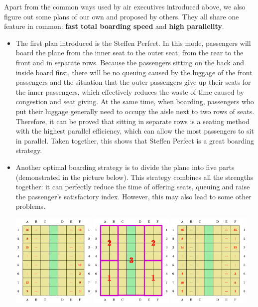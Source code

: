 \documentclass{article}
\theoremstyle{definition}
\theoremstyle{remark}
\numberwithin{equation}{section}
\begin{document}
	Apart from the common ways used by air executives introduced above, we also figure out some plans of our own and proposed by others. They all share one feature in common: \textbf{fast total boarding speed} and \textbf{high parallelity}.
	\begin{itemize}
		\item The first plan introduced is the Steffen Perfect\cite{steffen}. In this mode,  passengers will board the plane from the inner seat to the outer seat, from the rear to the front and in separate rows. Because the passengers sitting on the back and inside board first, there will be no queuing caused by the luggage of the front passengers and the situation that the outer passengers give up their seats for the inner passengers, which effectively reduces the waste of time caused by congestion and seat giving. At the same time, when boarding, passengers who put their luggage generally need to occupy the aisle next to two rows of seats. Therefore, it can be proved that sitting in separate rows is a seating method with the highest parallel efficiency, which can allow the most passengers to sit in parallel. Taken together, this shows that Steffen Perfect is a great boarding strategy.

		\item Another optimal boarding strategy is to divide the plane into five parts (demonstrated in the picture below). This strategy combines all the strengths together: it can perfectly reduce the time of offering seats, queuing and raise the passenger's satisfactory index. However, this may also lead to some other problems.

		\begin{center}
			\includegraphics[height = 4.5cm]{stf_perfect.jpg}
			\includegraphics[height=4.5cm]{planeown.jpg}
			\includegraphics[height = 4.5cm]{stf_subperfect.jpg}


\end{center}
\end{itemize}
\end{document}
